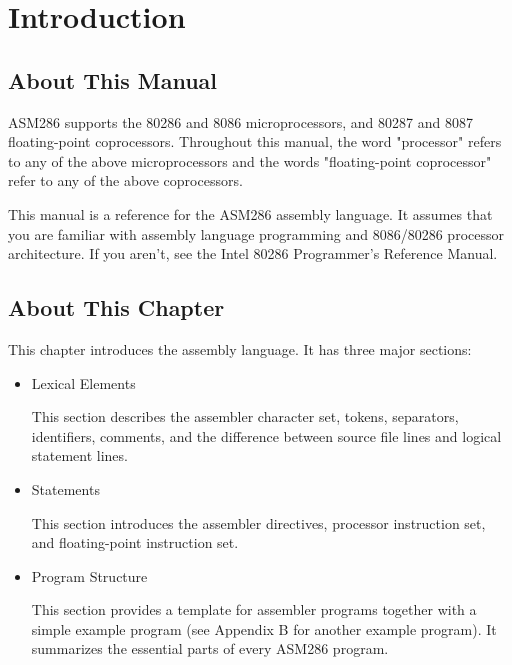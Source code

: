  

\chapter[Introduction]{Introduction}

\section*{About This Manual}

ASM286 supports the 80286 and 8086 microprocessors, and 80287 and 8087 floating-point coprocessors. Throughout this manual, the word "processor" refers to any of the above microprocessors and the words "floating-point coprocessor" refer to any of the above coprocessors.

This manual is a reference for the ASM286 assembly language. It assumes that you are familiar with assembly language programming and 8086/80286 processor architecture. If you aren't, see the Intel 80286 Programmer's Reference Manual.

\section*{About This Chapter}

This chapter introduces the assembly language. It has three major sections:

\begin{itemize}
\item Lexical Elements

This section describes the assembler character set, tokens, separators, identifiers, comments, and the difference between source file lines and logical statement lines.
\item Statements

This section introduces the assembler directives, processor instruction set, and
floating-point instruction set.
\item Program Structure

This section provides a template for assembler programs together with a simple example program (see Appendix B for another example program). It summarizes the essential parts of every ASM286 program.
\end{itemize}

